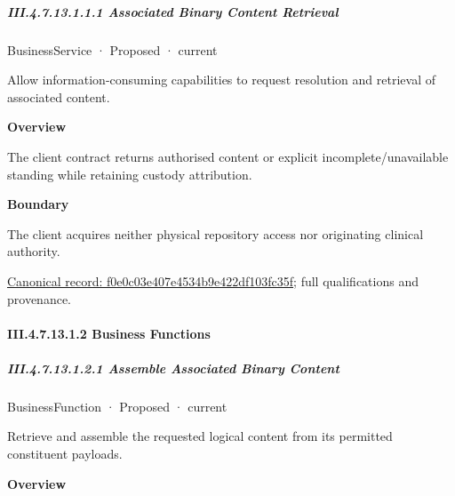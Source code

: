 \subparagraph*{III.4.7.13.1.1.1 Associated Binary Content Retrieval}
\label{navigation:III.4.7.13.1.1.1}

\label{element:f0e0c03e407e4534b9e422df103fc35f}
{\small BusinessService · Proposed · current}\par

Allow information-consuming capabilities to request resolution and retrieval of associated content.



\textbf{Overview}



The client contract returns authorised content or explicit incomplete/unavailable standing while retaining custody attribution.



\textbf{Boundary}



The client acquires neither physical repository access nor originating clinical authority.


{\footnotesize \href{../../../../../../../continuum/business/business-service/f0e0c03e407e4534b9e422df103fc35f.md}{Canonical record: f0e0c03e407e4534b9e422df103fc35f}; full qualifications and provenance.}\par
\paragraph*{III.4.7.13.1.2 Business Functions}
\label{navigation:III.4.7.13.1.2}

\subparagraph*{III.4.7.13.1.2.1 Assemble Associated Binary Content}
\label{navigation:III.4.7.13.1.2.1}

\label{element:0a0a5f3e40d241e38a5b155ca66eadd5}
{\small BusinessFunction · Proposed · current}\par

Retrieve and assemble the requested logical content from its permitted constituent payloads.



\textbf{Overview}



